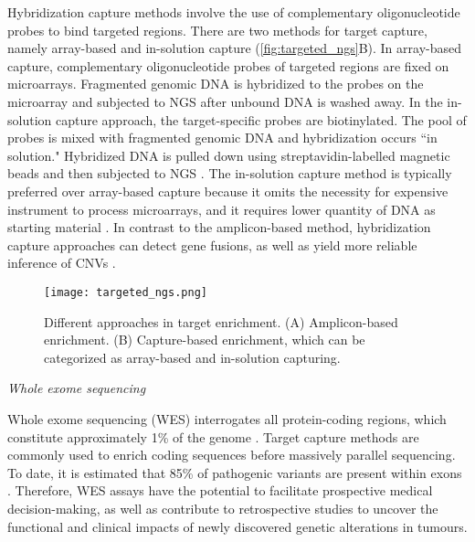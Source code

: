 Hybridization capture methods involve the use of complementary oligonucleotide probes to bind targeted regions. There are two methods for target capture, namely array-based and in-solution capture (\autoref{fig:targeted_ngs}B). In array-based capture, complementary oligonucleotide probes of targeted regions are fixed on microarrays. Fragmented genomic DNA is hybridized to the probes on the microarray and subjected to NGS after unbound DNA is washed away. In the in-solution capture approach, the target-specific probes are biotinylated. The pool of probes is mixed with fragmented genomic DNA and hybridization occurs ``in solution." Hybridized DNA is pulled down using streptavidin-labelled magnetic beads and then subjected to NGS \cite{Simon2013, Gagan2015}. The in-solution capture method is typically preferred over array-based capture because it omits the necessity for expensive instrument to process microarrays, and it requires lower quantity of DNA as starting material \cite{Bodi2013, Cui2013}. In contrast to the amplicon-based method, hybridization capture approaches can detect gene fusions, as well as yield more reliable inference of CNVs \cite{Simon2013, Gagan2015}.


\begin{figure}[H]
	\centering
	\texttt{[image: targeted\_ngs.png]}
	\caption[Different approaches in target enrichment.]{Different approaches in target enrichment. (A) Amplicon-based enrichment. (B) Capture-based enrichment, which can be categorized as array-based and in-solution capturing.}
	\label{fig:targeted_ngs}
\end{figure}


\newpage
\vspace{5mm}
\noindent\textit{Whole exome sequencing}

Whole exome sequencing (\acs{WES}) interrogates all protein-coding regions, which constitute approximately 1\% of the genome \cite{Simon2013, Rabbani2014}. Target capture methods are commonly used to enrich coding sequences before massively parallel sequencing. To date, it is estimated that 85\% of pathogenic variants are present within exons \cite{Rabbani2014}. Therefore, WES assays have the potential to facilitate prospective medical decision-making, as well as contribute to retrospective studies to uncover the functional and clinical impacts of newly discovered genetic alterations in tumours.


